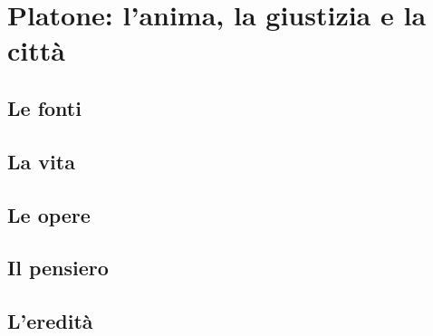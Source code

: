 \chapter{Platone: l'anima, la giustizia e la città}

\section{Le fonti}

\section{La vita}

\section{Le opere}

\section{Il pensiero}

\section{L'eredità}
